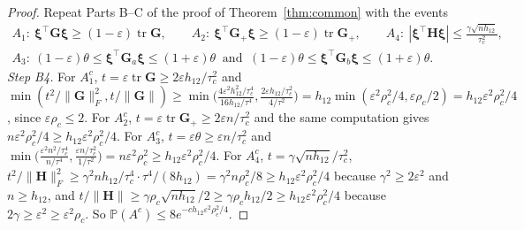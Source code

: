 \documentclass[11pt]{article}
\theoremstyle{definition}
\newcommand{\Prob}{\mathbb{P}}
\newcommand{\tr}{\operatorname{tr}}
\begin{document}
\begin{proof}
Repeat Parts B--C of the proof of Theorem~\ref{thm:common} with the events
\begin{gather*}
A_1:\ \bm\xi^\top\mathbf G\bm\xi\ge(1-\varepsilon)\tr\mathbf G,\qquad A_2:\ \bm\xi^\top\mathbf G_+\bm\xi\ge(1-\varepsilon)\tr\mathbf G_+,\qquad A_4:\ |\bm\xi^\top\mathbf H\bm\xi|\le\frac{\gamma\sqrt{nh_{12}}}{\tau_c^2},\\
A_3:\ (1-\varepsilon)\theta\le\bm\xi^\top\mathbf G_{a}\bm\xi\le(1+\varepsilon)\theta\ \text{ and }\ (1-\varepsilon)\theta\le\bm\xi^\top\mathbf G_{b}\bm\xi\le(1+\varepsilon)\theta .
\end{gather*}
\emph{Step B4.} For $A_1^c$, $t=\varepsilon\tr\mathbf G\ge2\varepsilon h_{12}/\tau_c^2$ and $\min(t^2/\|\mathbf G\|_F^2,t/\|\mathbf G\|)\ge\min\big(\tfrac{4\varepsilon^2h_{12}^2/\tau_c^4}{16h_{12}/\tau^4},\tfrac{2\varepsilon h_{12}/\tau_c^2}{4/\tau^2}\big)=h_{12}\min(\varepsilon^2\rho_c^2/4,\varepsilon\rho_c/2)=h_{12}\varepsilon^2\rho_c^2/4$, since $\varepsilon\rho_c\le2$. For $A_2^c$, $t=\varepsilon\tr\mathbf G_+\ge2\varepsilon n/\tau_c^2$ and the same computation gives $n\varepsilon^2\rho_c^2/4\ge h_{12}\varepsilon^2\rho_c^2/4$. For $A_3^c$, $t=\varepsilon\theta\ge\varepsilon n/\tau_c^2$ and $\min\big(\tfrac{\varepsilon^2n^2/\tau_c^4}{n/\tau^4},\tfrac{\varepsilon n/\tau_c^2}{1/\tau^2}\big)=n\varepsilon^2\rho_c^2\ge h_{12}\varepsilon^2\rho_c^2/4$. For $A_4^c$, $t=\gamma\sqrt{nh_{12}}/\tau_c^2$, $t^2/\|\mathbf H\|_F^2\ge\gamma^2nh_{12}/\tau_c^4\cdot\tau^4/(8h_{12})=\gamma^2n\rho_c^2/8\ge h_{12}\varepsilon^2\rho_c^2/4$ because $\gamma^2\ge2\varepsilon^2$ and $n\ge h_{12}$, and $t/\|\mathbf H\|\ge\gamma\rho_c\sqrt{nh_{12}}/2\ge\gamma\rho_ch_{12}/2\ge h_{12}\varepsilon^2\rho_c^2/4$ because $2\gamma\ge\varepsilon^2\ge\varepsilon^2\rho_c$. So $\Prob(A^c)\le8e^{-ch_{12}\varepsilon^2\rho_c^2/4}$.


\end{proof}
\end{document}

